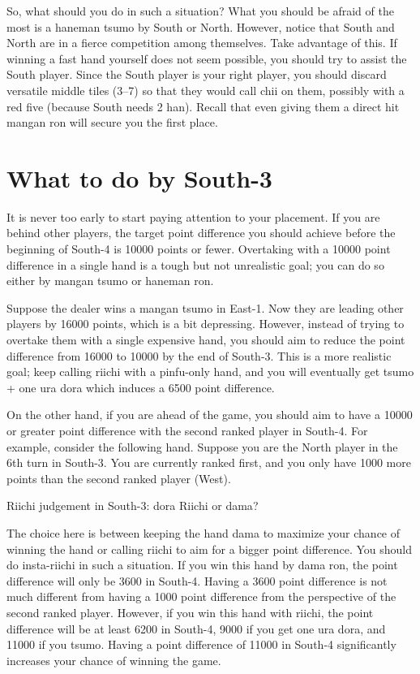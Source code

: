 \bigskip
So, what should you do in such a situation? 
What you should be afraid of the most is a {\jap haneman tsumo} by South or North. However, notice that South and North are in a fierce competition among themselves. Take advantage of this. If winning a fast hand yourself does not seem possible, you should try to assist the South player. Since the South player is your right player, you should discard versatile middle tiles (3--7) so that they would call {\jap chii} on them, possibly with a red five (because South needs 2 {\jap han}). Recall that even giving them a direct hit {\jap mangan ron} will secure you the first place. 

\section{What to do by South-3}
It is never too early to start paying attention to your placement. If you are behind other players, the target point difference you should achieve before the beginning of South-4 is 10000 points or fewer. Overtaking with a 10000 point difference in a single hand is a tough but not unrealistic goal; you can do so either by {\jap mangan tsumo} or {\jap haneman ron}. 

\bigskip
Suppose the dealer wins a {\jap mangan tsumo} in East-1. Now they are leading other players by 16000 points, which is a bit depressing. However, instead of trying to overtake them with a single expensive hand, you should aim to reduce the point difference from 16000 to 10000 by the end of South-3. This is a more realistic goal; keep calling riichi with a {\jap pinfu}-only hand, and you will eventually get {\jap tsumo} + one {\jap ura dora} which induces a 6500 point difference. 

\bigskip
On the other hand, if you are ahead of the game, you should aim to have a 10000 or greater point difference with the second ranked player in South-4. 
For example, consider the following hand. Suppose you are the North player in the 6th turn in South-3. You are currently ranked first, and you only have 1000 more points than the second ranked player (West). 

\bigskip
\begin{itembox}[r]{{\jap Riichi} judgement in South-3: {\jap dora} {\LARGE{}}}
\bp
{}\bei
\ep
\vspace{-10pt}
{\jap Riichi} or {\jap dama}?
\end{itembox}
\noindent The choice here is between keeping the hand {\jap dama} to maximize your chance of winning the hand or calling riichi to aim for a bigger point difference. 
You should do insta-riichi in such a situation. If you win this hand by {\jap dama ron}, the point difference will only be 3600 in South-4. Having a 3600 point difference is not much different from having a 1000 point difference from the perspective of the second ranked player. However, if you win this hand with riichi, the point difference will be at least 6200 in South-4, 9000 if you get one {\jap ura dora}, and 11000 if you {\jap tsumo}. Having a point difference of 11000 in South-4 significantly increases your chance of winning the game. 


